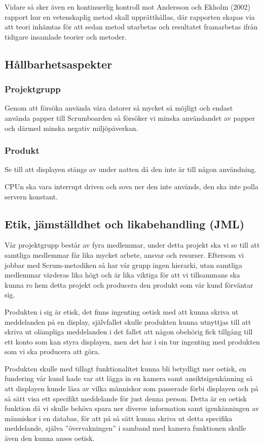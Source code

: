 \documentclass[11pt]{article}
\begin{document}
Vidare så sker även en kontinuerlig kontroll mot Andersson och Ekholm
(2002) rapport hur en vetenskaplig metod skall upprätthållas, där
rapporten skapas via att teori inhämtas för att sedan metod utarbetas
och resultatet framarbetas ifrån tidigare insamlade teorier och metoder.

\subsection{Hållbarhetsaspekter}
\label{sec:org7daab15}
\subsubsection{Projektgrupp}
\label{sec:orgcee6514}

Genom att försöka använda våra datorer så mycket så möjligt och
endast använda papper till Scrumboarden så försöker vi minska
användandet av papper och därmed minska negativ miljöpåverkan.

\subsubsection{Produkt}
\label{sec:org29fea51}

Se till att displayen stängs av under natten då den inte är till
någon användning.

CPUn ska vara interrupt driven och sova ner den inte används, den ska
inte polla servern konstant.

\subsection{Etik, jämställdhet och likabehandling (JML)}
\label{sec:org88fb1dc}
Vår projektgrupp består av fyra medlemmar, under detta projekt ska vi
se till att samtliga medlemmar får lika mycket arbete, ansvar och
resurser. Eftersom vi jobbar med Scrum-metodiken så har vår grupp
ingen hierarki, utan samtliga medlemmar värderas lika högt och är
lika viktiga för att vi tillsammans ska kunna ro hem detta projekt
och producera den produkt som vår kund förväntar sig.

Produkten i sig är etisk, det finns ingenting oetisk med att kunna
skriva ut meddelanden på en display, självfallet skulle produkten
kunna utnyttjas till att skriva ut olämpliga meddelanden i det fallet
att någon obehörig fick tillgång till ett konto som kan styra
displayen, men det har i sin tur ingenting med produkten som vi ska
producera att göra.

Produkten skulle med tillagt funktionalitet kunna bli betydligt mer
oetisk, en fundering vår kund hade var att lägga in en kamera samt
ansiktsigenkänning så att displayen kunde läsa av vilka människor som
passerade förbi displayen och på så sätt visa ett specifikt
meddelande för just denna person. Detta är en oetisk funktion då vi
skulle behöva spara ner diverse information samt igenkänningen av
människor i en databas, för att på så sätt kunna skriva ut detta
specifika meddelande, själva ”övervakningen” i samband med kamera
funktionen skulle även den kunna anses oetisk.
\end{document}
